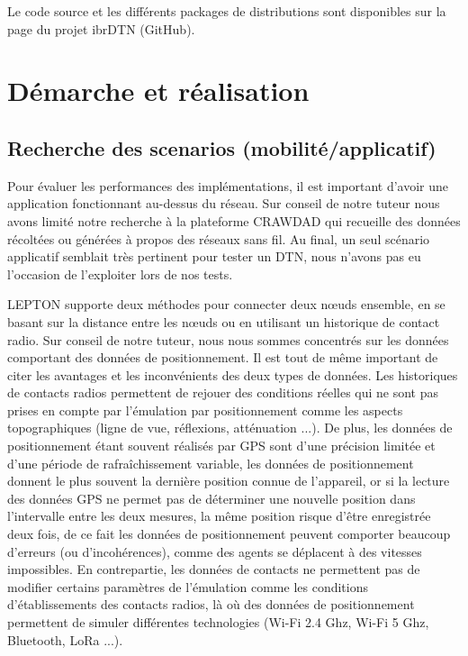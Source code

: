 \documentclass[a4paper,10pt]{article}
\begin{document}
Le code source et les différents packages de distributions sont disponibles sur la  page du projet ibrDTN (GitHub).

\section {Démarche et réalisation}

\subsection {Recherche des scenarios (mobilité/applicatif)}

Pour évaluer les performances des implémentations, il est important d'avoir une application fonctionnant au-dessus du réseau.
Sur conseil de notre tuteur nous avons limité notre recherche à la plateforme CRAWDAD qui recueille des données récoltées ou générées à propos des réseaux sans fil.
Au final, un seul scénario applicatif semblait très pertinent pour tester un DTN, nous n'avons pas eu l'occasion de l'exploiter lors de nos tests.

LEPTON supporte deux méthodes pour connecter deux nœuds ensemble, en se basant sur la distance entre les nœuds ou en utilisant un historique de contact radio.
Sur conseil de notre tuteur, nous nous sommes concentrés sur les données comportant des données de positionnement.
Il est tout de même important de citer les avantages et les inconvénients des deux types de données.
Les historiques de contacts radios permettent de rejouer des conditions réelles qui ne sont pas prises en compte par l'émulation par positionnement comme les aspects topographiques (ligne de vue, réflexions, atténuation ...).
De plus, les données de positionnement étant souvent réalisés par GPS sont d'une précision limitée et d'une période de rafraîchissement variable, 
les données de positionnement donnent le plus souvent la dernière position connue de l'appareil, 
or si la lecture des données GPS ne permet pas de déterminer une nouvelle position dans l'intervalle entre les deux mesures, la même position risque d'être enregistrée deux fois,
de ce fait les données de positionnement peuvent comporter beaucoup d'erreurs (ou d'incohérences), comme des agents se déplacent à des vitesses impossibles.
En contrepartie, les données de contacts ne permettent pas de modifier certains paramètres de l'émulation comme les conditions d'établissements des contacts radios,
là où des données de positionnement permettent de simuler différentes technologies (Wi-Fi 2.4 Ghz, Wi-Fi 5 Ghz, Bluetooth, LoRa ...).
\end{document}
